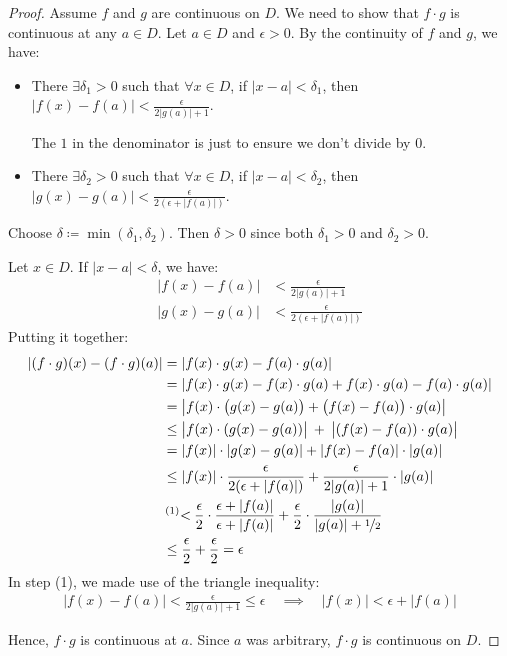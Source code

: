 \begin{proof}
    Assume $f$ and $g$ are continuous on $D$. We need to show that $f \cdot g$ is continuous at any $a \in D$. Let $a \in D$ and $\epsilon > 0$. By the continuity of $f$ and $g$, we have:

    \begin{itemize}
        \item There $\exists \delta_1 > 0$ such that
        $\forall x \in D$, if $|x - a| < \delta_1$,
        then $\displaystyle |f(x) - f(a)|
            < \frac{\epsilon}{2|g(a)| + 1}$.

        The $1$ in the denominator is just to ensure we don't divide by $0$.

        \item There $\exists \delta_2 > 0$ such that
        $\forall x \in D$, if $|x - a| < \delta_2$,
        then $\displaystyle |g(x) - g(a)|
            < \frac{\epsilon}{2(\epsilon + |f(a)|)}$.
    \end{itemize}

    Choose $\delta \coloneqq \min(\delta_1, \delta_2)$. Then $\delta > 0$ since both $\delta_1 > 0$ and $\delta_2 > 0$.
    
    Let $x\in D$. If $|x - a| < \delta$, we have:
    \begin{align*}
        |f(x) - f(a)| &< \frac{\epsilon}{2|g(a)| + 1}\\
        |g(x) - g(a)| &< \frac{\epsilon}{2(\epsilon + |f(a)|)}
    \end{align*}
    Putting it together:
    \begin{align*}
        |(f \cdot g)(x) - (f \cdot g)(a)|
        &= |f(x) \cdot g(x) - f(a) \cdot g(a)| \\
        &= |f(x) \cdot g(x) - f(x) \cdot g(a) + f(x) \cdot g(a) - f(a) \cdot g(a)| \\
        &= \bigl|f(x) \cdot \bigl(g(x) - g(a)\bigr)
            + \bigl(f(x) - f(a)\bigr) \cdot g(a) \bigr| \\
        &\leq \bigl|f(x) \cdot (g(x) - g(a)) \bigr|
            \: + \: \bigl|(f(x) - f(a)) \cdot g(a) \bigr| \\
        &= |f(x)| \cdot |g(x) - g(a)|+ |f(x) - f(a)| \cdot |g(a)|\\
        &\leq |f(x)| \cdot \frac{\epsilon}{2 (\epsilon + |f(a)|)}
            + \frac{\epsilon}{2 |g(a)| + 1} \cdot |g(a)| \\
        &\prescript{(1)}{}{<} \:
            \frac{\epsilon}{2} \cdot \frac{\epsilon + |f(a)|}{\epsilon + |f(a)|}
            + \frac{\epsilon}{2} \cdot \frac{|g(a)|}{|g(a)| + \nicefrac{1}{2}} \\
        &\leq \frac{\epsilon}{2} + \frac{\epsilon}{2} = \epsilon
    \end{align*}
    In step (1), we made use of the triangle inequality:
    \begin{align*}
        |f(x) - f(a)| < \frac{\epsilon}{2|g(a)| + 1} \leq \epsilon
        \quad \implies \quad
        |f(x)| < \epsilon + |f(a)|
    \end{align*}

    Hence, $f \cdot g$ is continuous at $a$. Since $a$ was arbitrary, $f \cdot g$ is continuous on $D$.
\end{proof}
